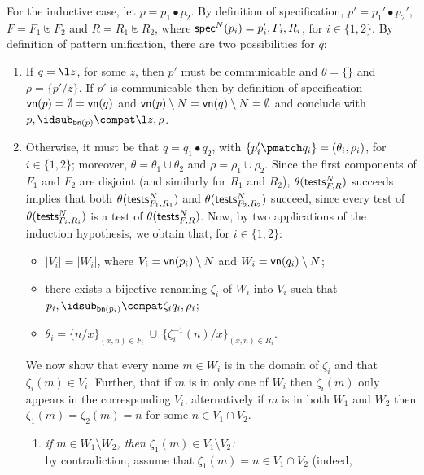 \documentclass{LMCS}
\begin{document}
For the inductive case, let $p = p_1\bullet p_2$. By definition of specification,
$p' = p_1'\bullet p_2'$, $F = F_1 \uplus F_2$ and $R = R_1 \uplus R_2$, where
${\sf spec}^{N}(p_i)=p_i',F_i,R_i$, for $i \in \{1,2\}$. 
By definition of pattern unification, there are two possibilities for $q$:
\begin{enumerate}
\item If $q=\l z$, for some $z$, then $p'$ must be communicable and
	$\theta = \{\}$ and $\rho = \{p'/z\}$.
    If $p'$ is communicable then by definition of specification
    ${\sf vn}(p)=\emptyset={\sf vn}(q)$ and ${\sf vn}(p) \setminus N = {\sf vn}(q) \setminus N = \emptyset$
    and conclude with $p,\idsub_{{\sf bn}(p)}\compat\l z,\rho$.

\item Otherwise, it must be that $q = q_1\bullet q_2$, with
	$\{p'_i\pmatch q_i\} = (\theta_i,\rho_i)$, for $i \in \{1,2\}$; moreover,
	$\theta = \theta_1 \cup \theta_2$ and $\rho = \rho_1 \cup \rho_2$.
	Since the first components of $F_1$ and $F_2$ are disjoint (and similarly for $R_1$ and $R_2$),
	$\theta({\sf tests}^N_{F,R})$ succeeds implies that both $\theta({\sf tests}^N_{F_1,R_1})$ and
	$\theta({\sf tests}^N_{F_2,R_2})$ succeed, since every test of $\theta({\sf tests}^N_{F_i,R_i})$
	is a test of $\theta({\sf tests}^N_{F,R})$. Now, by two applications of the induction hypothesis,
	we obtain that, for $i \in \{1,2\}$:
	\begin{itemize}
	\item $|V_i| = |W_i|$, where $V_i = {\sf vn}(p_i) \setminus N$ and $W_i = {\sf vn}(q_i) \setminus N$; 
	\item there exists a bijective renaming $\zeta_i$ of $W_i$ into $V_i$
	such that $p_i,\idsub_{{\sf bn}(p_i)}\compat \zeta_i q_i,\rho_i$;
	\item $\theta_i = \{n/x\}_{(x,n) \in F_i}\ \cup\ \{\zeta_i^{-1}(n)/x\}_{(x,n)\in R_i}$.
	\end{itemize}
    We now show that every name $m\in W_i$ is in the domain of $\zeta_i$ and that $\zeta_i(m)\in V_i$.
    Further, that if $m$ is in only one of $W_i$ then $\zeta_i(m)$ only appears in the
    corresponding $V_i$, alternatively if $m$ is in both $W_1$ and $W_2$ then $\zeta_1(m) = \zeta_2(m)=n$
    for some $n\in V_1\cap V_2$.
	\begin{enumerate}
	\item {\em if $m \in W_1 \setminus W_2$, then $\zeta_1(m) \in V_1 \setminus V_2$:}\\
		by contradiction, assume that $\zeta_1(m) = n \in V_1 \cap V_2$ (indeed, 

\end{enumerate}
\end{enumerate}
\end{document}
